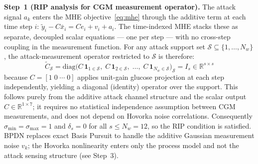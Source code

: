 \documentclass[journal,twoside]{IEEEtran}
\newcommand{\R}{\mathbb{R}}
\begin{document}
\textbf{Step~1 (RIP analysis for CGM measurement operator).}
The attack signal $a_k$ enters the MHE objective~\eqref{eq:mhe}
through the additive term at each time step $i$:
$\tilde y_i - C\bar x_i = Ce_i + v_i + a_i$.
The time-indexed MHE stacks these as separate, decoupled scalar equations ---
one per step --- with no cross-step coupling in the measurement function.
For any attack support set $\mathcal{S}\subseteq\{1,\ldots,N_w\}$, the
attack-measurement operator restricted to $\mathcal{S}$ is therefore:
\begin{equation}\label{eq:B1}
  \tilde C_\mathcal{S} = \mathrm{diag}\bigl(
    C\,\mathbf{1}_{1\in\mathcal{S}},\;
    C\,\mathbf{1}_{2\in\mathcal{S}},\;\ldots,\;
    C\,\mathbf{1}_{N_w\in\mathcal{S}}\bigr)_{\mathcal{S}}
  = I_s \in \R^{s\times s}
\end{equation}
because $C{=}[1\;0\;\cdots\;0]$ applies unit-gain glucose projection at each step
independently, yielding a diagonal (identity) operator over the support. 
This follows purely from the additive attack channel structure and the scalar
output $C\in\R^{1\times 7}$; it requires no statistical independence assumption
between CGM measurements, and does not depend on Hovorka noise correlations.
Consequently $\sigma_{\min}{=}\sigma_{\max}{=}1$ and $\delta_s{=}0$ for all
$s\leq N_w{=}12$, so the RIP condition is satisfied.
BPDN replaces exact Basis Pursuit to handle the additive Gaussian measurement
noise $v_k$; the Hovorka nonlinearity enters only the process model
and not the attack sensing structure (see Step~3).
\end{document}
